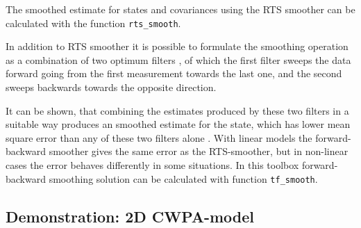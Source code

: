 The smoothed estimate for states and covariances using the RTS smoother can be
calculated with the function \texttt{rts\_smooth}.

In addition to RTS smoother it is possible to formulate the smoothing operation as a combination
of two optimum filters \citep{Fraser+Potter:1969}, of which the first filter sweeps the data forward going from the first measurement towards the last one, and the second sweeps backwards towards the opposite direction.

It can be shown, that combining the estimates produced by these two filters in a suitable way produces an smoothed estimate for the state, which has lower mean square error than any of these two filters alone \citep{Gelb:1974}. With linear models the forward-backward smoother gives the same error as the RTS-smoother, but in non-linear cases the error behaves differently in some
situations. In this toolbox forward-backward smoothing solution can be
calculated with function \texttt{tf\_smooth}.


%
\subsection{Demonstration: 2D CWPA-model}
%

